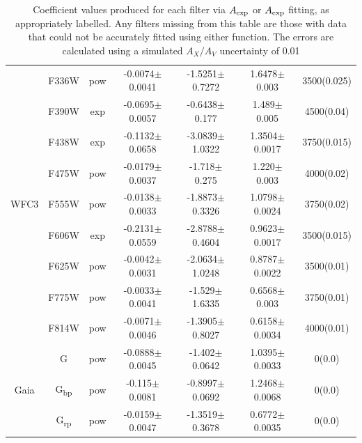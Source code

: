 \documentclass[12pt, a4paper]{report}
\begin{document}
\begin{table}
\begin{center}
\begin{tabular}{ccccccc}
& F336W & pow & -0.0074$\pm$0.0041 & -1.5251$\pm$0.7272 & 1.6478$\pm$0.003 & 3500(0.025) \\
& F390W & exp & -0.0695$\pm$0.0057 & -0.6438$\pm$0.177 & 1.489$\pm$0.005 & 4500(0.04) \\
& F438W & exp & -0.1132$\pm$0.0658 & -3.0839$\pm$1.0322 & 1.3504$\pm$0.0017 & 3750(0.015) \\
& F475W & pow & -0.0179$\pm$0.0037 & -1.718$\pm$0.275 & 1.220$\pm$0.003 & 4000(0.02) \\
WFC3 & F555W & pow & -0.0138$\pm$0.0033 & -1.8873$\pm$0.3326 & 1.0798$\pm$0.0024 & 3750(0.02) \\
& F606W & exp & -0.2131$\pm$0.0559 & -2.8788$\pm$0.4604 & 0.9623$\pm$0.0017 & 3500(0.015) \\
& F625W & pow & -0.0042$\pm$0.0031 & -2.0634$\pm$1.0248 & 0.8787$\pm$0.0022 & 3500(0.01) \\
& F775W & pow & -0.0033$\pm$0.0041 & -1.529$\pm$1.6335 & 0.6568$\pm$0.003 & 3750(0.01) \\
& F814W & pow & -0.0071$\pm$0.0046 & -1.3905$\pm$0.8027 & 0.6158$\pm$0.0034 & 4000(0.01) \\ \hline

& G & pow & -0.0888$\pm$0.0045 & -1.402$\pm$0.0642 & 1.0395$\pm$0.0033 & 0(0.0) \\
Gaia & G\textsubscript{bp} & pow & -0.115$\pm$0.0081 & -0.8997$\pm$0.0692 & 1.2468$\pm$0.0068 & 0(0.0) \\
& G\textsubscript{rp} & pow & -0.0159$\pm$0.0047 & -1.3519$\pm$0.3678 & 0.6772$\pm$0.0035 & 0(0.0) \\ \hline

\end{tabular}
\caption{Coefficient values produced for each filter via $A_{\textnormal{exp}}$ or $A_{\textnormal{exp}}$ fitting, as appropriately labelled. Any filters missing from this table are those with data that could not be accurately fitted using either function. The errors are calculated using a simulated $A_{X}/A_{V}$ uncertainty of 0.01}
\label{simpfunc_coeffs_table}
\end{center}
\end{table}
\end{document}
